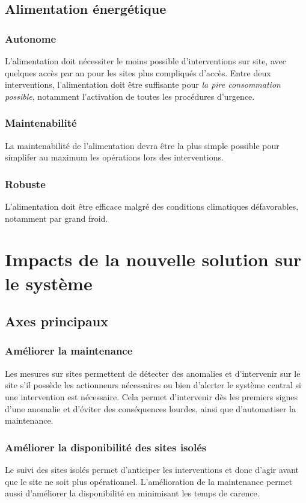 \documentclass[a4paper, 11pt]{article}
\begin{document}
\subsection{Alimentation énergétique}
	\subsubsection{Autonome}
	L'alimentation doit nécessiter le moins possible d'interventions sur site, avec quelques accès par an pour les sites plus compliqués d'accès.
	Entre deux interventions, l'alimentation doit être suffisante pour \emph{la pire consommation possible}, notamment l'activation de toutes les procédures d'urgence.
	\subsubsection{Maintenabilité}
	La maintenabilité de l'alimentation devra être la plus simple possible pour simplifer au maximum les opérations lors des interventions.
	\subsubsection{Robuste}
    L'alimentation doit être efficace malgré des conditions climatiques défavorables, notamment par grand froid.

\section{Impacts de la nouvelle solution sur le système}
\subsection{Axes principaux}
\subsubsection{Améliorer la maintenance}
Les mesures sur sites permettent de détecter des anomalies et d'intervenir sur le site s'il possède les actionneurs nécessaires ou bien d'alerter le système central si une intervention est nécessaire. Cela permet d'intervenir dès les premiers signes d'une anomalie et d'éviter des conséquences lourdes, ainsi que d'automatiser la maintenance.
\subsubsection{Améliorer la disponibilité des sites isolés}
Le suivi des sites isolés permet d'anticiper les interventions et donc d'agir avant que le site ne soit plus opérationnel. L'amélioration de la maintenance permet aussi d'améliorer la disponibilité en minimisant les temps de carence.
\end{document}
